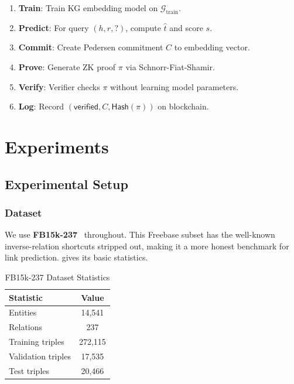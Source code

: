 \documentclass[conference, 10pt]{IEEEtran}
\newcommand{\Hash}{\mathsf{Hash}}
\begin{document}
\begin{enumerate}
    \item \textbf{Train}: Train KG embedding model on $\mathcal{G}_{\text{train}}$.
    \item \textbf{Predict}: For query $(h, r, ?)$, compute $\hat{t}$ and score $s$.
    \item \textbf{Commit}: Create Pedersen commitment $C$ to embedding vector.
    \item \textbf{Prove}: Generate ZK proof $\pi$ via Schnorr-Fiat-Shamir.
    \item \textbf{Verify}: Verifier checks $\pi$ without learning model parameters.
    \item \textbf{Log}: Record $(\mathsf{verified}, C, \Hash(\pi))$ on blockchain.
\end{enumerate}

\section{Experiments}
\label{sec:experiments}

\subsection{Experimental Setup}

\subsubsection{Dataset}
We use \textbf{FB15k-237}~\cite{toutanova2015observed} throughout. This Freebase subset has the well-known inverse-relation shortcuts stripped out, making it a more honest benchmark for link prediction.  gives its basic statistics.

\begin{table}[h]
\centering
\caption{FB15k-237 Dataset Statistics}
\label{tab:dataset}
\begin{tabular}{lc}
\toprule
\textbf{Statistic} & \textbf{Value} \\
\midrule
Entities & 14,541 \\
Relations & 237 \\
Training triples & 272,115 \\
Validation triples & 17,535 \\
Test triples & 20,466 \\
\bottomrule
\end{tabular}
\end{table}
\end{document}

